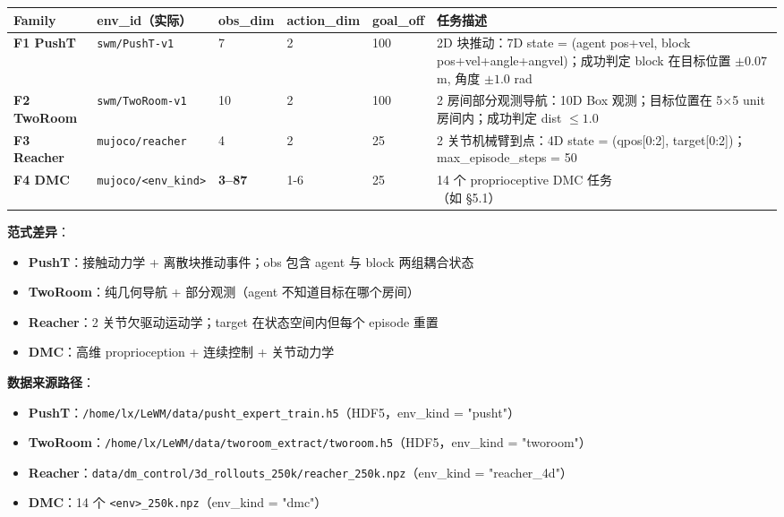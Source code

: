 \documentclass[11pt,a4paper]{article}
\begin{document}
\begin{table}
\centering
\small
\begin{adjustbox}{max width=\textheight}
\scriptsize
\begin{tabular}{p{}p{}p{}p{}p{}p{}}
\toprule
\textbf{Family} & \textbf{env\_id（实际）} & \textbf{obs\_dim} & \textbf{action\_dim} & \textbf{goal\_off} & \textbf{任务描述} \\
\midrule
\textbf{F1 PushT} & \texttt{swm/PushT-v1} & 7  & 2 & 100 & 2D 块推动：7D state = (agent pos+vel, block pos+vel+angle+angvel)；成功判定 block 在目标位置 $\pm 0.07$ m, 角度 $\pm 1.0$ rad \\
\textbf{F2 TwoRoom} & \texttt{swm/TwoRoom-v1} & 10 & 2 & 100 & 2 房间部分观测导航：10D Box 观测；目标位置在 5×5 unit 房间内；成功判定 dist $\leq 1.0$ \\
\textbf{F3 Reacher} & \texttt{mujoco/reacher} & 4 & 2 & 25 & 2 关节机械臂到点：4D state = (qpos[0:2], target[0:2])；max\_episode\_steps = 50 \\
\textbf{F4 DMC} & \texttt{mujoco/<env\_kind>} & \textbf{3--87} & 1-6 & 25 & \shortstack[l]{14 个 proprioceptive DMC 任务\\（如 §5.1）} \\
\bottomrule
\end{tabular}
\end{adjustbox}
\end{table}
\textbf{范式差异}：
\begin{itemize}[leftmargin=2em]
    \item \textbf{PushT}：接触动力学 + 离散块推动事件；obs 包含 agent 与 block 两组耦合状态
    \item \textbf{TwoRoom}：纯几何导航 + 部分观测（agent 不知道目标在哪个房间）
    \item \textbf{Reacher}：2 关节欠驱动运动学；target 在状态空间内但每个 episode 重置
    \item \textbf{DMC}：高维 proprioception + 连续控制 + 关节动力学
\end{itemize}

\textbf{数据来源路径}：
\begin{itemize}[leftmargin=2em]
    \item \textbf{PushT}：\texttt{/home/lx/LeWM/data/pusht\_expert\_train.h5}（HDF5，env\_kind = "pusht"）
    \item \textbf{TwoRoom}：\texttt{/home/lx/LeWM/data/tworoom\_extract/tworoom.h5}（HDF5，env\_kind = "tworoom"）
    \item \textbf{Reacher}：\texttt{data/dm\_control/3d\_rollouts\_250k/reacher\_250k.npz}（env\_kind = "reacher\_4d"）
    \item \textbf{DMC}：14 个 \texttt{<env>\_250k.npz}（env\_kind = "dmc"）
\end{itemize}
\end{document}
